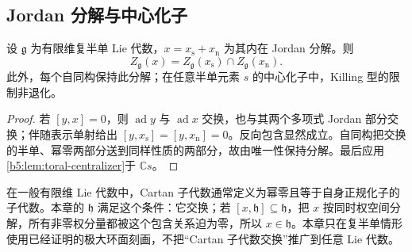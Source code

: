 \subsection{Jordan 分解与中心化子}
\label{b5:subsec:1601:04}

\begin{proposition}\label{b5:prop:jordan-centralizer}
	设 \(\mathfrak g\) 为有限维复半单 Lie 代数，\(x=x_{\mathrm s}+x_{\mathrm n}\) 为其内在 Jordan 分解。则
	\[
		Z_{\mathfrak g}(x) =Z_{\mathfrak g}(x_{\mathrm s})\cap Z_{\mathfrak g}(x_{\mathrm n}).
	\]
	此外，每个自同构保持此分解；在任意半单元素 \(s\) 的中心化子中，Killing 型的限制非退化。
\end{proposition}
\begin{proof}
	若 \([y,x]=0\)，则 \(\operatorname{ad}y\) 与 \(\operatorname{ad}x\) 交换，也与其两个多项式 Jordan 部分交换；伴随表示单射给出 \([y,x_{\mathrm s}]=[y,x_{\mathrm n}]=0\)。反向包含显然成立。自同构把交换的半单、幂零两部分送到同样性质的两部分，故由唯一性保持分解。最后应用\cref{b5:lem:toral-centralizer}于 \(\mathbb Cs\)。
\end{proof}

在一般有限维 Lie 代数中，Cartan 子代数通常定义为幂零且等于自身正规化子的子代数。本章的 \(\mathfrak h\) 满足这个条件：它交换；若 \([x,\mathfrak h]\subseteq\mathfrak h\)，把 \(x\) 按同时权空间分解，所有非零权分量都被这个包含关系迫为零，所以 \(x\in\mathfrak h\)。本章只在复半单情形使用已经证明的极大环面刻画，不把“Cartan 子代数交换”推广到任意 Lie 代数。
